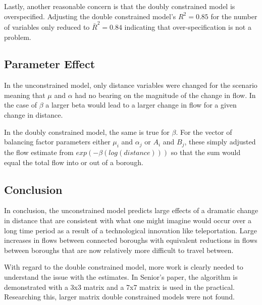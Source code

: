 \documentclass[11pt]{article} %
\begin{document}
Lastly, another reasonable concern is that the doubly constrained model is overspecified. Adjusting the double constrained model's $R^2 = 0.85$ for the number of variables only reduced to $\bar{R}^2 = 0.84$ indicating that over-specification is not a problem.  

\subsection{Parameter Effect}

In the unconstrained model, only distance variables were changed for the scenario meaning that $\mu$ and $\alpha$ had no bearing on the magnitude of the change in flow. In the case of $\beta$ a larger beta would lead to a larger change in flow for a given change in distance. 

In the doubly constrained model, the same is true for $\beta$. For the vector of balancing factor parameters either $\mu_i$ and $\alpha_j$ or $A_i$ and $B_j$, these simply adjusted the flow estimate from $exp(-\beta (log(distance)))$ so that the sum would equal the total flow into or out of a borough. 

\subsection{Conclusion}

In conclusion, the unconstrained model predicts large effects of a dramatic change in distance that are consistent with what one might imagine would occur over a long time period as a result of a technological innovation like teleportation. Large increases in flows between connected boroughs with equivalent reductions in flows between boroughs that are now relatively more difficult to travel between. 

With regard to the double constrained model, more work is clearly needed to understand the issue with the estimates. In Senior's paper, the algorithm is demonstrated with a 3x3 matrix and a 7x7 matrix is used in the practical. Researching this, larger matrix double constrained models were not found. 








\end{document}
